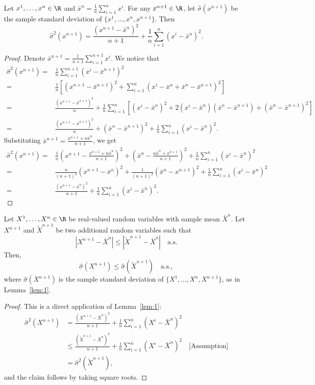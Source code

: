 \begin{lemma}\label{lem:1}
    Let $x^1,\ldots,x^n \in \R$ and $\bar{x}^n = \frac{1}{n}\sum^n_{i=1}x^i$. For any $x^{n+1}\in \R$, let $\hat\sigma(x^{n+1})$ be the sample standard deviation of $\{x^1,\ldots,x^n, x^{n+1}\}$. Then
    \[
    \hat\sigma^2(x^{n+1}) = \frac{(x^{n+1}-\bar{x}^{n})^2}{n+1}+\frac{1}{n}\sum^n_{i=1}(x^i-\bar{x}^{n})^2.
    \]
\end{lemma}
\begin{proof}
    Denote $\bar{x}^{n+1} = \frac{1}{n+1}\sum^{n+1}_{i=1}x^i$. We notice that
\begin{align*}
    \hat\sigma^2(x^{n+1}) = &\frac{1}{n}\sum^{n+1}_{i=1}(x^i-\bar{x}^{n+1})^2\\
    = &\frac{1}{n} \left[ (x^{n+1}-\bar{x}^{n+1})^2+\sum^n_{i=1}(x^i-\bar{x}^{n}+\bar{x}^{n}-\bar{x}^{n+1})^2 \right]\\
    = &\frac{(x^{n+1}-\bar{x}^{n+1})^2}{n}+\frac{1}{n}\sum^n_{i=1}\left[(x^i-\bar{x}^{n})^2+2(x^i-\bar{x}^n)(\bar{x}^n-\bar{x}^{n+1})+(\bar{x}^{n}-\bar{x}^{n+1})^2\right]\\
    = &\frac{(x^{n+1}-\bar{x}^{n+1})^2}{n}+(\bar{x}^{n}-\bar{x}^{n+1})^2+\frac{1}{n}\sum^n_{i=1}(x^i-\bar{x}^{n})^2.
\end{align*}
Substituting $\bar{x}^{n+1} = \frac{x^{n+1}+n\bar{x}^n}{n+1}$, we get
\begin{align*}    
    \hat\sigma^2(x^{n+1}) = &\frac{1}{n}\left(x^{n+1}-\frac{x^{n+1}+n\bar{x}^n}{n+1}\right)^2+\left(\bar{x}^n-\frac{n\bar{x}^n+x^{n+1}}{n+1}\right)^2+\frac{1}{n}\sum^n_{i=1}(x^i-\bar{x}^{n})^2\\
    = &\frac{n}{(n+1)^2}(x^{n+1}-\bar{x}^n)^2+\frac{1}{(n+1)^2}(\bar{x}^n-x^{n+1})^2+\frac{1}{n}\sum^n_{i=1}(x^i-\bar{x}^{n})^2\\
    = &\frac{(x^{n+1}-\bar{x}^{n})^2}{n+1}+\frac{1}{n}\sum^n_{i=1}(x^i-\bar{x}^{n})^2.
\end{align*}
\end{proof}

\begin{lemma}\label{lem:2}
    Let $X^1,\ldots, X^n \in \R$ be real-valued random variables with sample mean $\bar{X}^n$. Let $X^{n+1}$ and $\tilde{X}^{n+1}$ be two additional random variables such that
    \[
    |X^{n+1} - \bar{X}^n| \leq |\tilde{X}^{n+1}-\bar{X}^n| \quad \text{a.s.}
    \]
    Then,
    \[
    \hat{\sigma}(X^{n+1}) \leq \hat{\sigma}(\tilde{X}^{n+1}) \quad \text{a.s.},
    \]
    where $\hat{\sigma}(X^{n+1})$ is the sample standard deviation of $\{X^1,\ldots,X^n, X^{n+1}\}$, as in Lemma~\ref{lem:1}.
\end{lemma}
\begin{proof}
    This is a direct application of Lemma~\ref{lem:1}:
\begin{align*}
    \hat{\sigma}^2(X^{n+1}) 
    &= \frac{(X^{n+1}-\bar{X}^{n})^2}{n+1}+\frac{1}{n}\sum^n_{i=1}(X^i-\bar{X}^{n})^2\\
    &\leq \frac{(\tilde{X}^{n+1}-\bar{X}^{n})^2}{n+1}+\frac{1}{n}\sum^n_{i=1}(X^i-\bar{X}^{n})^2 \quad \text{[Assumption]}\\
    &=\hat{\sigma}^2(\tilde{X}^{n+1}),
\end{align*}
and the claim follows by taking square roots.
\end{proof}



